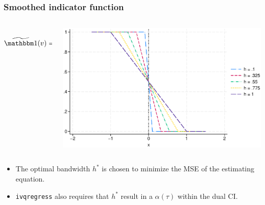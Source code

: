 \documentclass[11pt]{beamer}
\begin{document}
\begin{frame}
  \frametitle{Smoothed indicator function}
  \begin{columns}
    \begin{column}{0.4\textwidth}
\begin{align*}
\Is(v) & =
\begin{cases}
  1 & \text{if $v \leq -1$} \\
  0 & \text{if $v \geq 1$}\\
  \frac{1-v}{2} &\text{if $-1 < v < 1$}
\end{cases}
\end{align*}
\end{column}

\begin{column}{0.6\textwidth}
\begin{center}
\includegraphics[scale=0.4]{eps/i_sgmm}
\end{center}
\end{column}
\end{columns}

\begin{itemize}
  \item The optimal bandwidth $h^*$ is chosen to minimize the MSE of the
    estimating equation.
  \item {\tt ivqregress} also requires that $h^*$ result in a $\alpha(\tau)$
    within the dual CI.
\end{itemize}
\end{frame}

\end{document}
